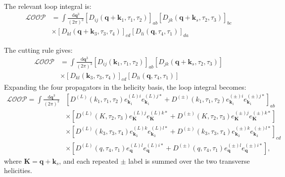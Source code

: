 \documentclass[a4paper,12pt]{article}
\def\di{{\mathrm{d}}}
\def\mb{\mathbf}
\begin{document}
The relevant loop integral is:
\begin{align}
    \mathcal{LOOP} &= 
    \int \frac{\di \mb{q}^3}{(2\pi)^3} 
    \left[ D_{ij}(\mb q+\mb k_1,\tau_1,\tau_2) \right]_{ab} 
    \left[ D_{jk}(\mb q+\mb k_s,\tau_2,\tau_3) \right]_{bc}  \nonumber \\
    &\times \left[ D_{kl}( \mb{q}+\mb k_3,\tau_3,\tau_4) \right]_{cd} 
    \left[ D_{li}( \mb{q},\tau_4,\tau_1) \right]_{da}
\end{align}

The cutting rule gives:
\begin{align}
    \mathcal{LOOP} &= 
    \int \frac{\di \mb{q}^3}{(2\pi)^3} 
    \left[ D_{ij}(\mb k_1,\tau_1,\tau_2) \right]_{ab} 
    \left[ D_{jk}(\mb q+\mb k_s,\tau_2,\tau_3) \right] \nonumber \\
    &\times \left[ D_{kl}( \mb{k}_3,\tau_3,\tau_4) \right]_{cd}
    \left[ D_{li}( \mb{q},\tau_4,\tau_1) \right]
\end{align}
Expanding the four propagators in the helicity basis, the loop integral becomes:
\begin{align}
    \mathcal{LOOP}
    =\int\frac{\di\mb q^3}{(2\pi)^3}
    &\left[D^{(L)}(k_1,\tau_1,\tau_2)
    e^{(L)i}_{\mb k_1}e^{(L)j*}_{\mb k_1}
    +D^{(\pm)}(k_1,\tau_1,\tau_2)
    e^{(\pm)i}_{\mb k_1}e^{(\pm)j*}_{\mb k_1}\right]_{ab} \nonumber \\
    &\times\left[D^{(L)}(K,\tau_2,\tau_3)
    e^{(L)j}_{\mb K}e^{(L)k*}_{\mb K}
    +D^{(\pm)}(K,\tau_2,\tau_3)
    e^{(\pm)j}_{\mb K}e^{(\pm)k*}_{\mb K}\right] \nonumber \\
    &\times\left[D^{(L)}(k_3,\tau_3,\tau_4)
    e^{(L)k}_{\mb k_3}e^{(L)l*}_{\mb k_3}
    +D^{(\pm)}(k_3,\tau_3,\tau_4)
    e^{(\pm)k}_{\mb k_3}e^{(\pm)l*}_{\mb k_3}\right]_{cd} \nonumber \\
    &\times\left[D^{(L)}(q,\tau_4,\tau_1)
    e^{(L)l}_{\mb q}e^{(L)i*}_{\mb q}
    +D^{(\pm)}(q,\tau_4,\tau_1)
    e^{(\pm)l}_{\mb q}e^{(\pm)i*}_{\mb q}\right],
\end{align}
where $\mb K=\mb q+\mb k_s$, and each repeated $\pm$ label is summed over the two transverse helicities.
\end{document}
